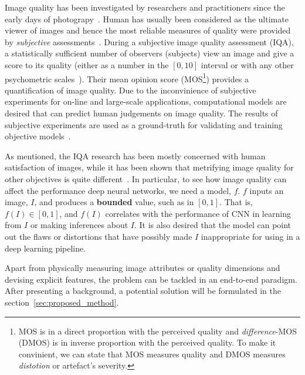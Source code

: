 \documentclass{article}
\begin{document}
Image quality has been investigated by researchers and practitioners since the early days of photograpy~\cite{allen2012manual}. Human has usually been considered as the ultimate viewer of images and hence the most reliable measures of quality were provided by \emph{subjective} assessments~\cite{chandler2013seven}. During a subjective image quality assessment (IQA), a statistically sufficient number of observers (subjects) view an image and give a score to its quality (either as a number in the $[0, 10]$ interval or with any other psychometric scales~\cite{stevens1946theory}). Their mean opinion score (MOS\footnote{MOS is in a direct proportion with the perceived quality and \emph{difference}-MOS (DMOS) is in inverse proportion with the perceived quality. To make it convinient, we can state that MOS measures quality and DMOS measures \emph{distotion} or artefact's severity.}) provides a quantification of image quality. Due to the inconvinience of subjective experiments for on-line and large-scale applications, computational models are desired that can predict human judgements on image quality. The results of subjective experiments are used as a ground-truth for validating and training objective models~\cite{seshadrinathan2011automatic}. 

As mentioned, the IQA research has been mostly concerned with human satisfaction of images, while it has been shown that metrifying image quality for other objectives is quite different~\cite{ye2013document}. In particular, to see how image quality can affect the performance deep neural networks, we need a model, $f$. $f$ inputs an image, $I$, and produces a \textbf{bounded} value, such as in $[0, 1]$. That is, $f(I) \in [0, 1]$, and $f(I)$ correlates with the performance of CNN in learning from $I$ or making inferences about $I$. It is also desired that the model can point out the flaws or distortions that have possibly made $I$ inappropriate for using in a deep learning pipeline.

Apart from physically measuring image attributes or quality dimensions and devising explicit features, the problem can be tackled in an end-to-end paradigm. After presenting a background, a potential solution will be formulated in the section~\ref{sec:proposed_method}.

\end{document}
